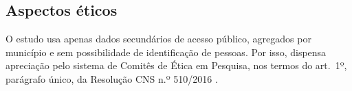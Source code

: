 \subsection{Aspectos éticos}

O estudo usa apenas dados secundários de acesso público, agregados por município e sem possibilidade de identificação de pessoas. Por isso, dispensa apreciação pelo sistema de Comitês de Ética em Pesquisa, nos termos do art.~1º, parágrafo único, da Resolução CNS n.º 510/2016 \citep{cns2016resolucao510}.
